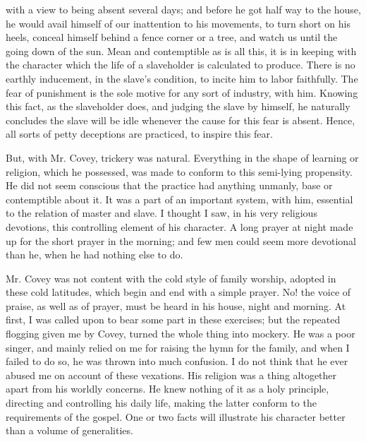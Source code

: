 with a view to being absent several days; and before he got half way to
the house, he would avail himself of our inattention to his movements,
to turn short on his heels, conceal himself behind a fence corner or a
tree, and watch us until the going down of the sun. Mean and
contemptible as is all this, it is in keeping with the character which
the life of a slaveholder is calculated to produce. There is no earthly
inducement, in the slave's condition, to incite him to labor faithfully.
The fear of punishment is the sole motive for any sort of industry, with
him. Knowing this fact, as the slaveholder does, and judging the slave
by himself, he naturally concludes the slave will be idle whenever the
cause for this fear is absent. Hence, all sorts of petty deceptions are
practiced, to inspire this fear.

But, with Mr. Covey, trickery was natural. Everything in the shape of
learning or religion, which {\protect\hypertarget{217}{}{}}he possessed,
was made to conform to this semi-lying propensity. He did not seem
conscious that the practice had anything unmanly, base or contemptible
about it. It was a part of an important system, with him, essential to
the relation of master and slave. I thought I saw, in his very religious
devotions, this controlling element of his character. A long prayer at
night made up for the short prayer in the morning; and few men could
seem more devotional than he, when he had nothing else to do.

Mr. Covey was not content with the cold style of family worship, adopted
in these cold latitudes, which begin and end with a simple prayer. No!
the voice of praise, as well as of prayer, must be heard in his house,
night and morning. At first, I was called upon to bear some part in
these exercises; but the repeated flogging given me by Covey, turned the
whole thing into mockery. He was a poor singer, and mainly relied on me
for raising the hymn for the family, and when I failed to do so, he was
thrown into much confusion. I do not think that he ever abused me on
account of these vexations. His religion was a thing altogether apart
from his worldly concerns. He knew nothing of it as a holy principle,
directing and controlling his daily life, making the latter conform to
the requirements of the gospel. One or two facts will illustrate his
character better than a volume of generalities.

